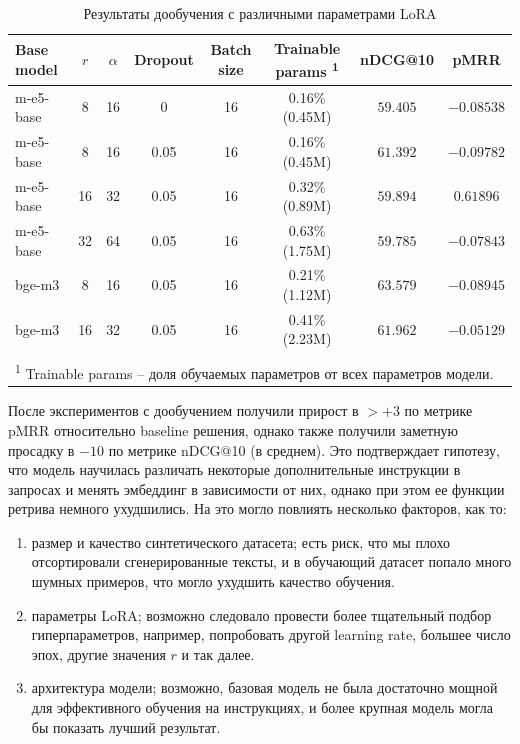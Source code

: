 \documentclass[12pt, a4paper, oneside]{article}
\begin{document}
\begin{table}[H]
    \centering
    \caption{Результаты дообучения с различными параметрами LoRA}
    \label{tab:lora_results}
    \begin{tabular}{lccccccc}
        \toprule
        \textbf{Base model} & $r$ & $\alpha$ & \textbf{Dropout} & \textbf{Batch size} & \textbf{Trainable params} \textsuperscript{1} & \textbf{nDCG@10} & \textbf{pMRR} \\
        \midrule
        m-e5-base & 8 & 16 & 0 & 16 & 0.16\% (0.45M) & $59.405$ & $-0.08538$ \\
        m-e5-base & 8 & 16 & 0.05 & 16 & 0.16\% (0.45M) & $61.392$ & $-0.09782$ \\
        m-e5-base & 16 & 32 & 0.05 & 16 & 0.32\% (0.89M) & $59.894$ & $0.61896$ \\
        m-e5-base & 32 & 64 & 0.05 & 16 & 0.63\% (1.75M) & $59.785$ & $-0.07843$ \\
        \midrule
        bge-m3 & 8 & 16 & 0.05 & 16 & 0.21\% (1.12M) & $63.579$ & $-0.08945$ \\
        bge-m3 & 16 & 32 & 0.05 & 16 & 0.41\% (2.23M) & $61.962$ & $-0.05129$ \\
        \bottomrule
        \\
        \multicolumn{8}{l}{\footnotesize \textsuperscript{1} Trainable params -- доля обучаемых параметров от всех параметров модели.}
    \end{tabular}
    \vspace{0.2cm}
\end{table}

После экспериментов с дообучением получили прирост в $>+3$ по метрике 
pMRR относительно baseline решения, однако также получили 
заметную просадку в $-10$ по метрике nDCG@10 (в среднем). 
Это подтверждает гипотезу, что модель научилась различать 
некоторые дополнительные инструкции в запросах и менять 
эмбеддинг в зависимости от них, однако при этом ее 
функции ретрива немного ухудшились. 
На это могло повлиять несколько факторов, как то:

\begin{enumerate}
    \item размер и качество синтетического датасета; есть риск, что мы плохо отсортировали сгенерированные тексты, 
    и в обучающий датасет попало много шумных примеров, что могло ухудшить качество обучения.
    
    \item параметры LoRA; возможно следовало провести более тщательный подбор гиперпараметров, 
    например, попробовать другой learning rate, большее число эпох, другие значения $r$ и так далее. 

    \item архитектура модели; возможно, базовая модель не была достаточно мощной 
    для эффективного обучения на инструкциях, и более крупная 
    модель могла бы показать лучший результат.
\end{enumerate}
\end{document}

